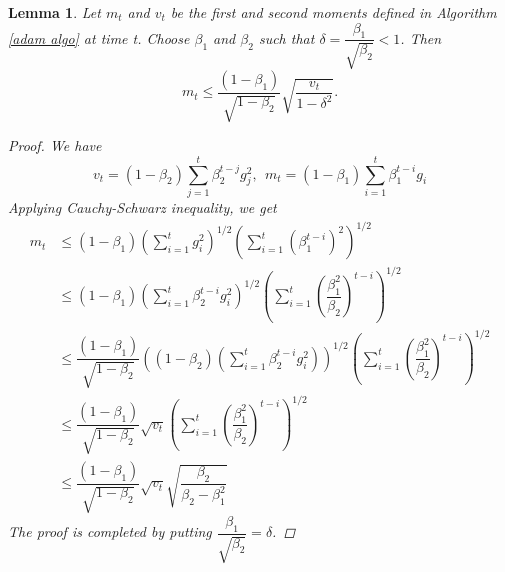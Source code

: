 \documentclass[12pt]{article}
\newtheorem{lem}[thm]{Lemma}%
\begin{document}
\begin{lem}\label{mt in terms of vt}
Let $m_{t}$ and $v_{t}$ be the first and second moments defined in Algorithm \ref{adam algo} at time t. Choose $\beta_1$ and $\beta_2$ such that $\delta=\dfrac{\beta_{1}}{\sqrt{\beta_{2}}} < 1$. Then 
$$m_{t} \leq \dfrac{(1-\beta_{1})}{\sqrt{1-\beta_{2}}}\sqrt{\dfrac{v_t}{1-\delta^2}}.$$ 
\begin{proof} We have
        $$v_{t} = (1-\beta_{2})\sum_{j=1}^t{\beta_{2}^{t-j}g_j^{2}},\ \ 
        m_{t} = (1 - \beta_{1})\sum_{i=1}^{t}{\beta_{1}^{t-i}g_{i}}$$
 Applying Cauchy-Schwarz inequality, we get
    \begin{align*}
        m_{t} &\leq  (1-\beta_{1})\left(\sum_{i=1}^{t}{g_{i}^{2}}\right)^{1/2}\left(\sum_{i=1}^{t}       {(\beta_{1}^{t-i})^{2}}\right)^{1/2} \\
        &\leq  (1-\beta_{1})\left(\sum_{i=1}^{t}{\beta_{2}^{t-i}g_{i}^{2}}\right)^{1/2}\left(\sum_{i=1}^{t}{\left(\dfrac{\beta_{1}^{2}}{\beta_{2}}\right)^{t-i}}\right)^{1/2} \\
        &\leq \dfrac{(1-\beta_{1})}{\sqrt{1-\beta_{2}}}\left((1-\beta_{2})\left(\sum_{i=1}^{t}{\beta_{2}^{t-i}g_{i}^{2}}\right)\right)^{1/2}\left(\sum_{i=1}^{t}{\left(\dfrac{\beta_{1}^{2}}{\beta_{2}}\right)^{t-i}}\right)^{1/2} \\
        &\leq \dfrac{(1-\beta_{1})}{\sqrt{1-\beta_{2}}}\sqrt{v_{t}}\left(\sum_{i=1}^{t}{\left(\dfrac{\beta_{1}^{2}}{\beta_{2}}\right)^{t-i}}\right)^{1/2} \\
        &\leq \dfrac{(1-\beta_{1})}{\sqrt{1-\beta_{2}}}\sqrt{v_{t}}\sqrt{\dfrac{\beta_{2}}{\beta_{2} - \beta_{1}^{2}}}
    \end{align*}
   The proof is completed by putting $\dfrac{\beta_1}{\sqrt{\beta_2}}=\delta$.
\end{proof}
\end{lem}
\end{document}
